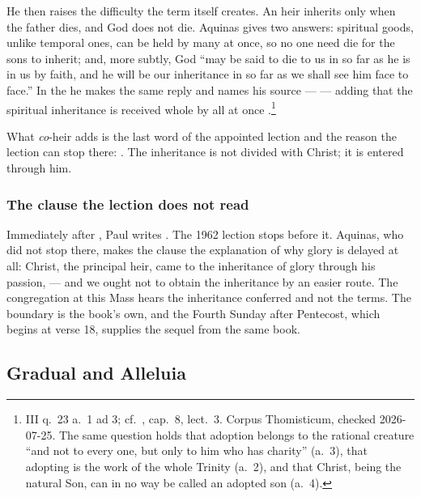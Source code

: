 He then raises the difficulty the term itself creates. An heir inherits only
when the father dies, and God does not die. Aquinas gives two answers:
spiritual goods, unlike temporal ones, can be held by many at once, so no one
need die for the sons to inherit; and, more subtly, God ``may be said to die to
us in so far as he is in us by faith, and he will be our inheritance in so far
as we shall see him face to face.'' In the  he makes the same reply
and names his source ---  --- adding that the spiritual inheritance is received whole
by all at once .\footnote{
 III q.\ 23 a.\ 1 ad 3; cf.\ , cap.\ 8, lect.\ 3.
Corpus Thomisticum, checked 2026-07-25. The same question holds that adoption
belongs to the rational creature ``and not to every one, but only to him who
has charity'' (a.\ 3), that adopting is the work of the whole Trinity (a.\ 2),
and that Christ, being the natural Son, can in no way be called an adopted son
(a.\ 4).}

What \emph{co}-heir adds is the last word of the appointed lection and the
reason the lection can stop there: . The inheritance is not
divided with Christ; it is entered through him.

\subsubsection*{The clause the lection does not read}

Immediately after , Paul writes . The 1962 lection stops before it. Aquinas,
who did not stop there, makes the clause the explanation of why glory is
delayed at all: Christ, the principal heir, came to the inheritance of glory
through his passion,  --- and we ought not to obtain the inheritance by an easier route.
The congregation at this Mass hears the inheritance conferred and not the
terms. The boundary is the book's own, and the Fourth Sunday after Pentecost,
which begins at verse 18, supplies the sequel from the same book.

\subsection{Gradual and Alleluia }

